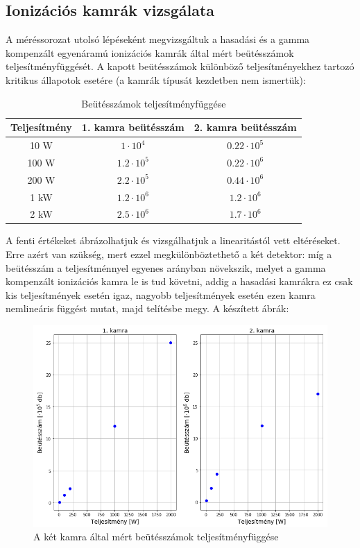 \documentclass[12pt,a4paper]{article}
\begin{document}
\subsection{Ionizációs kamrák vizsgálata}
\hspace*{10pt} A méréssorozat utolsó lépéseként megvizsgáltuk a hasadási és a gamma kompenzált egyenáramú ionizációs kamrák által mért beütésszámok teljesítményfüggését. A kapott beütésszámok különböző teljesítményekhez tartozó kritikus állapotok esetére (a kamrák típusát kezdetben nem ismertük):
\begin{table}[!h]
\begin{center}
\begin{tabular}{|c|c|c|}
\hline
Teljesítmény & 1. kamra beütésszám & 2. kamra beütésszám\\
\hline
\hline
10 W & $1\cdot 10^4$ & $0.22\cdot 10^5$\\
\hline
100 W & $1.2 \cdot 10^5 $ & $0.22\cdot 10^6$ \\
\hline
200 W & $2.2 \cdot 10^5 $ & $0.44 \cdot 10^6$ \\
\hline
1 kW & $1.2 \cdot 10^6 $ & $1.2 \cdot 10^6 $\\
\hline
2 kW & $2.5\cdot 10^6 $ & $1.7\cdot 10^6$ \\
\hline
\end{tabular}
\caption{Beütésszámok teljesítményfüggése}
\end{center}
\end{table}
\newline
A fenti értékeket ábrázolhatjuk és vizsgálhatjuk a linearitástól vett eltéréseket. Erre azért van szükség, mert ezzel megkülönböztethető a két detektor: míg a beütésszám a teljesítménnyel egyenes arányban növekszik, melyet a gamma kompenzált ionizációs kamra le is tud követni, addig a hasadási kamrákra ez csak kis teljesítmények esetén igaz, nagyobb teljesítmények esetén ezen kamra nemlineáris függést mutat, majd telítésbe megy. A készített ábrák:
\begin{figure}[!h]
\centering
\includegraphics[scale=0.5]{Kamrak.png}
\caption{A két kamra által mért beütésszámok teljesítményfüggése}
\end{figure}
\end{document}
